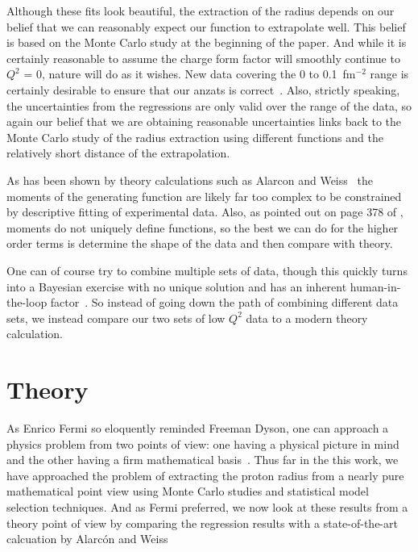 \documentclass[10pt,superscriptaddress,aps,prc,twocolumn]{revtex4-1}
\begin{document}
Although these fits look beautiful, the extraction of the radius depends on
our belief that we can reasonably expect our function to extrapolate well.
This belief is based on the Monte Carlo study at the beginning of the paper.    And while it is certainly reasonable
to assume the charge form factor will smoothly continue to $Q^2$ = 0,
nature will do as it wishes. New data covering the 0 to 0.1~fm$^{-2}$ range is 
certainly desirable to ensure that our anzats is correct~\cite{Gasparian:2014rna,
Peng:2016szv, Mihovilovic:2016rkr}.   
Also, strictly speaking, the
uncertainties from the regressions are only valid over the range of the data, so again our 
belief that we are obtaining reasonable uncertainties links back to the Monte Carlo study of the
radius extraction using different functions and the relatively short distance of the extrapolation.

As has been shown by theory calculations
such as Alarcon and Weiss~\cite{Alarcon:2017lhg,Alarcon:2018irp}
the moments of the generating function are likely far too complex to be constrained
by descriptive fitting of experimental data.  Also, as pointed out on page 378 of \cite{Sirca:2016}, 
moments do not uniquely define functions, so the best
we can do for the higher order terms is determine the shape of the data and then compare with theory.

One can of course try to combine multiple sets of data, though this quickly turns into a Bayesian exercise
with no unique solution and has an inherent human-in-the-loop factor~\cite{Daee:2018:UMA:3172944.3172989}.
So instead of going down the path of combining different data sets, we instead compare our two sets of 
low $Q^2$ data to a modern theory calculation.

\section{Theory}

As Enrico Fermi so eloquently reminded Freeman Dyson, one can approach a physics problem from two points
of view: one having a physical picture in mind and the other having a firm mathematical basis~\cite{Dyson:2004}.  
Thus far in the this work, we have approached the problem of extracting the proton radius from a nearly pure 
mathematical point view using Monte Carlo studies and statistical model selection techniques.  
And as Fermi preferred, we now look at these results from a theory point of view by comparing the 
regression results with a state-of-the-art calcuation by Alarc\'{o}n and 
Weiss~\cite{Alarcon:2018irp,Alarcon:2017ivh,Alarcon:2017chi,Alarcon:2017lhg,Alarcon:2012kn}
\end{document}
